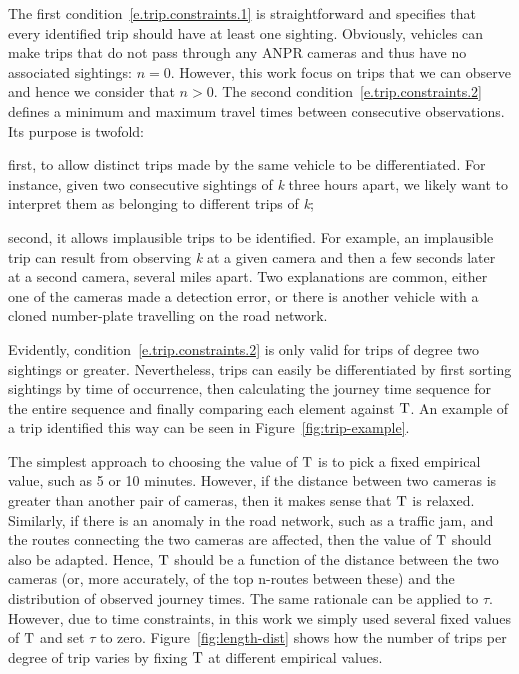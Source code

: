 The first condition~\ref{e.trip.constraints.1} is straightforward and specifies that every identified trip should have at least one sighting. Obviously, vehicles can make trips that do not pass through any ANPR cameras and thus have no associated sightings: $n = 0$. However, this work focus on trips that we can observe and hence we consider that $n > 0$. The second condition~\ref{e.trip.constraints.2} defines a minimum and maximum travel times between consecutive observations. Its purpose is twofold:
\begin{enumerate*}[label=(\roman*)]
  \item first, to allow distinct trips made by the same vehicle to be differentiated. For instance, given two consecutive sightings of \emph{k} three hours apart, we likely want to interpret them as belonging to different trips of \emph{k};
  \item second, it allows implausible trips to be identified. For example, an implausible trip can result from observing \emph{k} at a given camera and then a few seconds later at a second camera, several miles apart. Two explanations are common, either one of the cameras made a detection error, or there is another vehicle with a cloned number-plate travelling on the road network.
\end{enumerate*} Evidently, condition~\ref{e.trip.constraints.2} is only valid for trips of degree two sightings or greater. Nevertheless, trips can easily be differentiated by first sorting sightings by time of occurrence, then calculating the journey time sequence for the entire sequence and finally comparing each element against $\mathrm{T}$. An example of a trip identified this way can be seen in Figure~\ref{fig:trip-example}.

The simplest approach to choosing the value of $\mathrm{T}$ is to pick a fixed empirical value, such as 5 or 10 minutes. However, if the distance between two cameras is greater than another pair of cameras, then it makes sense that $\mathrm{T}$ is relaxed. Similarly, if there is an anomaly in the road network, such as a traffic jam, and the routes connecting the two cameras are affected, then the value of $\mathrm{T}$ should also be adapted. Hence, $\mathrm{T}$ should be a function of the distance between the two cameras (or, more accurately, of the top n-routes between these) and the distribution of observed journey times. The same rationale can be applied to $\tau$. However, due to time constraints, in this work we simply used several fixed values of $\mathrm{T}$ and set $\tau$ to zero. Figure~\ref{fig:length-dist} shows how the number of trips per degree of trip varies by fixing $\mathrm{T}$ at different empirical values.


